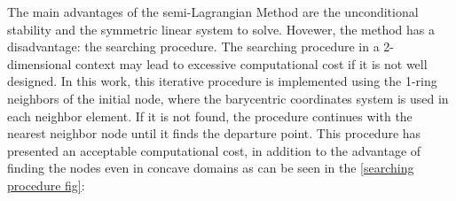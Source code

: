 \medskip
The main advantages of the semi-Lagrangian Method are
the unconditional stability and the symmetric linear system to solve.
Hovewer, the method has a disadvantage: the searching procedure.
The searching procedure in a 2-dimensional context may
lead to excessive computational cost if it is not
well designed. In this work, this iterative procedure is implemented
using the 1-ring neighbors of the initial node, where
the barycentric coordinates system is used in each neighbor element.
If it is not found, the procedure continues with the nearest
neighbor node until it finds the departure point. 
This procedure has presented an acceptable computational cost, 
in addition to the advantage of finding the nodes 
even in concave domains as can be seen in the \ref{searching procedure fig}:

\vspace{-0.5cm}
